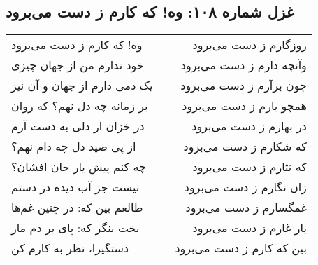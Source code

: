 \begin{center}
\section*{غزل شماره ۱۰۸: وه! که کارم ز دست می‌برود}
\label{sec:108}
\begin{longtable}{l p{0.5cm} r}
وه! که کارم ز دست می‌برود
&&
روزگارم ز دست می‌برود
\\
خود ندارم من از جهان چیزی
&&
وآنچه دارم ز دست می‌برود
\\
یک دمی دارم از جهان و آن نیز
&&
چون برآرم ز دست می‌برود
\\
بر زمانه چه دل نهم؟ که روان
&&
همچو یارم ز دست می‌برود
\\
در خزان ار دلی به دست آرم
&&
در بهارم ز دست می‌برود
\\
از پی صید دل چه دام نهم؟
&&
که شکارم ز دست می‌برود
\\
چه کنم پیش یار جان افشان؟
&&
که نثارم ز دست می‌برود
\\
نیست جز آب دیده در دستم
&&
زان نگارم ز دست می‌برود
\\
طالعم بین که: در چنین غم‌ها
&&
غمگسارم ز دست می‌برود
\\
بخت بنگر که: پای بر دم مار
&&
یار غارم ز دست می‌برود
\\
دستگیرا، نظر به کارم کن
&&
بین که کارم ز دست می‌برود
\\
\end{longtable}
\end{center}
